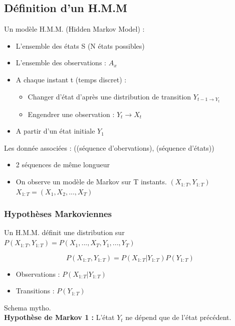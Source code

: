 \documentclass{article}
\begin{document}
\subsection{Définition d'un H.M.M}

Un modèle H.M.M. (Hidden Markov Model) : 
\begin{itemize}
\item L'ensemble des états S (N états possibles)
\item L'ensemble des observations : $A_x$
\item A chaque instant t (temps discret) :
  \begin{itemize}
  \item Changer d'état d'après une distribution de transition $Y_{t-1 \rightarrow Y_t}$
  \item Engendrer une observation : $Y_t \rightarrow X_t$
  \end{itemize}
\item A partir d'un état initiale $Y_1$ 
\end{itemize}

Les donnée associées : ((séquence d'obervations), (séquence d'états))
\begin{itemize}
\item 2 séquences de même longueur
\item On observe un modèle de Markov sur T instants. $(X_{1:T}, Y_{1:T})$ \\ $ X_{1:T} = (X_1, X_2, ..., X_T) $
\end{itemize}

\subsubsection{Hypothèses Markoviennes}

Un H.M.M. définit une distribution sur $P(X_{1:T}, Y_{1:T}) = P(X_1, ..., X_T, Y_1, ..., Y_T)$

\[ P(X_{1:T}, Y_{1:T}) = P(X_{1:T} | Y_{1:T}) P(Y_{1:T})  \]

\begin{itemize}
\item Observations : $P(X_{1:T} | Y_{1:T})$
\item Transitions : $P(Y_{1:T})$
\end{itemize}

Schema mytho. \\

\textbf{Hypothèse de Markov 1 :} L'état $Y_t$ ne dépend que de l'état précédent. \\
\end{document}
